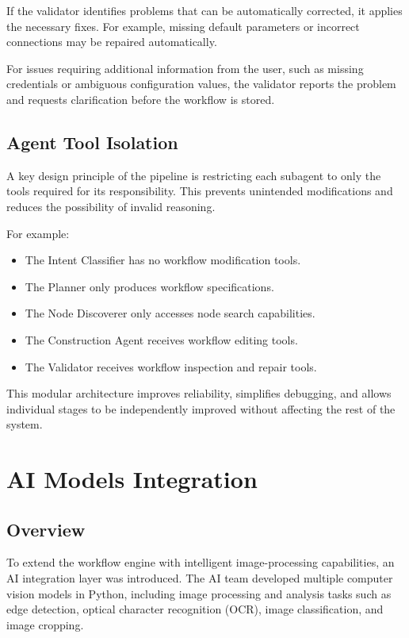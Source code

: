 If the validator identifies problems that can be automatically corrected, it applies the necessary fixes. For example, missing default parameters or incorrect connections may be repaired automatically.

For issues requiring additional information from the user, such as missing credentials or ambiguous configuration values, the validator reports the problem and requests clarification before the workflow is stored.

\subsection{Agent Tool Isolation}

A key design principle of the pipeline is restricting each subagent to only the tools required for its responsibility. This prevents unintended modifications and reduces the possibility of invalid reasoning.

For example:

\begin{itemize}
    \item The Intent Classifier has no workflow modification tools.
    \item The Planner only produces workflow specifications.
    \item The Node Discoverer only accesses node search capabilities.
    \item The Construction Agent receives workflow editing tools.
    \item The Validator receives workflow inspection and repair tools.
\end{itemize}

This modular architecture improves reliability, simplifies debugging, and allows individual stages to be independently improved without affecting the rest of the system.

\section{AI Models Integration}

\subsection{Overview}

To extend the workflow engine with intelligent image-processing capabilities, an AI integration layer was introduced. The AI team developed multiple computer vision models in Python, including image processing and analysis tasks such as edge detection, optical character recognition (OCR), image classification, and image cropping.

